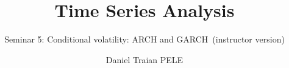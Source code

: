 \title[Time Series Analysis]{Time Series Analysis}
\subtitle{Seminar 5: Conditional volatility: ARCH and GARCH\ifsolutions\ (instructor version)\fi}
\author[D.T. Pele]{Daniel Traian PELE}
\date{}

\providecommand{\tsaapplink}[3]{\hypertarget{#2}{}\hyperlink{#1}{\beamergotobutton{#3}}}  %
\providecommand{\tsaappback}[2]{\begin{tikzpicture}[remember picture,overlay]\node[anchor=south east] at ([xshift=-3mm,yshift=7mm]current page.south east){\hyperlink{#1}{\beamerreturnbutton{#2}}};\end{tikzpicture}}  %
\providecommand{\tsachlink}[2]{\href{#1}{#2}}  %
\providecommand{\tsachlinkt}[2]{\href{#1}{\usebeamercolor[fg]{frametitle}#2}}  %


